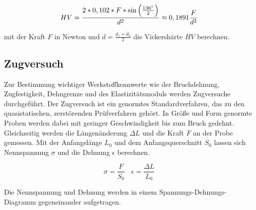 \begin{equation}
\centering
HV=\frac {2*0,102*F*\sin \left( \frac{136^\circ}{2}\right) } {d^2} \approx 0,1891 \frac{F}{d^2}
\label{eq:HV}
\end{equation}

mit der Kraft $F$ in Newton und $d=\frac {d_1 + d_2}{2} $ die Vickershärte $HV$ berechnen. 

\subsection{Zugversuch}
Zur Bestimmung wichtiger Werkstoffkennwerte wie der Bruchdehnung, Zugfestigkeit, Dehngrenze und des Elastizitätsmoduls werden Zugversuche durchgeführt. Der Zugversuch ist ein genormtes Standardverfahren, das zu den quasistatischen, zerstörenden Prüfverfahren gehört. In Größe und Form genormte Proben werden dabei mit geringer Geschwindigkeit bis zum Bruch gedehnt. Gleichzeitig werden die Längenänderung $\Delta L$ und die Kraft $F$ an der Probe gemessen. Mit der Anfangslänge $L_0$ und dem Anfangsquerschnitt $S_0$ lassen sich Nennspannung $\sigma$ und die Dehnung $\epsilon$ berechnen.

\begin{equation}
\sigma=\frac{F}{S_0} ~~~~
\epsilon=\frac{\Delta L} {L_0}
\end{equation}

Die Nennspannung und Dehnung werden in einem Spannungs-Dehnungs-Diagramm gegeneinander aufgetragen. 